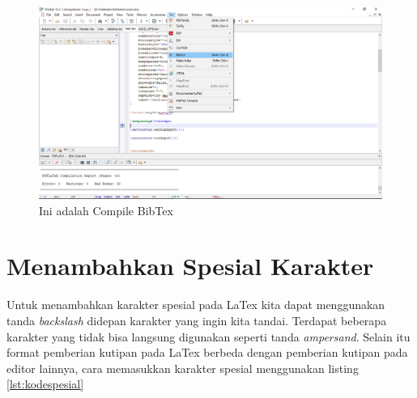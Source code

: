 \begin{enumerate}
\begin{figure}[!htbp]
\end{figure}
   \begin{figure}[!htbp]
  \centering
  \includegraphics[width=.75\textwidth]{figures/bibtexx.png}
  \caption{Ini adalah Compile BibTex}\label{fig:bibtexx}
\end{figure}
\end{enumerate}

\section{Menambahkan Spesial Karakter}
Untuk menambahkan karakter spesial pada LaTex kita dapat menggunakan tanda \textit{backslash} didepan karakter yang ingin kita tandai. Terdapat beberapa karakter yang tidak bisa langsung digunakan seperti tanda \textit{ampersand}. Selain itu format pemberian kutipan pada LaTex berbeda dengan pemberian kutipan pada editor lainnya, cara memasukkan karakter spesial menggunakan listing \ref{lst:kodespesial}


